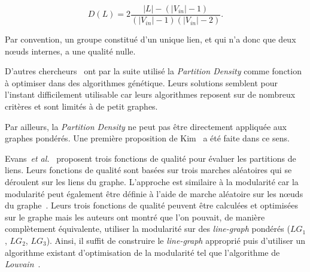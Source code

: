 \begin{equation}
 D(L) = 2 \dfrac{|L| - (|V_{in}|-1) }{(|V_{in}|-1) (|V_{in}|-2)}.
\end{equation}

Par convention, un groupe constitué d'un unique lien, et qui n'a donc que deux n\oe uds internes, a une qualité nulle.

D'autres chercheurs~\cite{Li2013,Shi2013} ont par la suite utilisé la \emph{Partition Density} comme fonction à optimiser dans des algorithmes génétique.
Leurs solutions semblent pour l'instant difficilement utilisable car leurs algorithmes reposent sur de nombreux critères et sont limités à de petit graphes.

Par ailleurs, la \emph{Partition Density} ne peut pas être directement appliquée aux graphes pondérés.
Une première proposition de Kim~\cite{Kim2014} a été faite dans ce sens.




Evans~\emph{et al.}~\cite{Evans2009} proposent trois fonctions de qualité pour évaluer les partitions de liens.
Leurs fonctions de qualité sont basées sur trois marches aléatoires qui se déroulent sur les liens du graphe.
L'approche est similaire à la modularité car la modularité peut également être définie à l'aide de marche aléatoire sur les n\oe uds du graphe~\cite{Delvenne2010}.
Leurs trois fonctions de qualité peuvent être calculées et optimisées sur le graphe mais les auteurs ont montré que l'on pouvait, de manière complètement équivalente, utiliser la modularité sur des \emph{line-graph} pondérés ($LG_1$, $LG_2$, $LG_3$).
Ainsi, il suffit de construire le \emph{line-graph} approprié puis d'utiliser un algorithme existant d'optimisation de la modularité tel que l'algorithme de \emph{Louvain}~\cite{Blondel2008a}.


